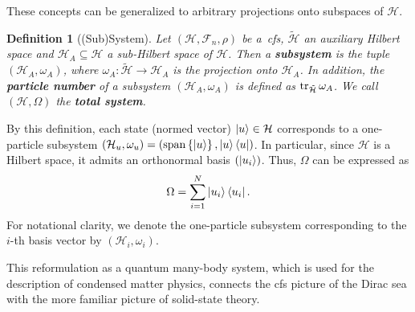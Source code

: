 \documentclass[reqno,11pt]{amsart}
\DeclareMathOperator{\Span}{span}
\renewcommand{\H}{\mathcal{H}}
\newcommand{\F}{{\mathcal{F}}}
\newtheorem{definition}{Definition}[section]
\numberwithin{equation}{section}
\begin{document}
These concepts can be generalized to arbitrary projections onto subspaces of $\H$.
\begin{definition}[(Sub)System]
    Let $(\H, \F_n, \rho)$ be a~\ac{cfs}, $\tilde{\H}$ an auxiliary Hilbert space and $\H_A \subseteq \H$ a sub-Hilbert space of $\H$.
    Then a \textbf{subsystem} is the tuple $(\H_A, \omega_A)$, where $\omega_A: \tilde{\H} \to \H_A$ is the projection onto $\H_A$.
    In addition, the \textbf{particle number} of a subsystem $(\H_A, \omega_A)$ is defined as $\tr_{\tilde{\H}} \omega_A$.
    We call $(\H, \Omega)$ the \textbf{total system}.
\end{definition}

By this definition, each state (normed vector) $\ket{u} \in \H$ corresponds to a one-particle subsystem $(\H_u, \omega_u) = (\Span\left\{ \ket{u} \right\}, \ket{u}\bra{u})$.
In particular, since $\H$ is a Hilbert space, it admits an orthonormal basis $\left( \ket{u_i} \right)$.
Thus, $\Omega$ can be expressed as
\begin{align}
    \Omega = \sum_{i = 1}^N \ket{u_i}\bra{u_i}.
\end{align}
For notational clarity, we denote the one-particle subsystem corresponding to the $i$-th basis vector by $(\H_i, \omega_i)$.

This reformulation as a quantum many-body system, which is used for the description of condensed matter physics, connects
the \ac{cfs} picture of the Dirac sea with the more familiar picture of solid-state theory.
\end{document}
